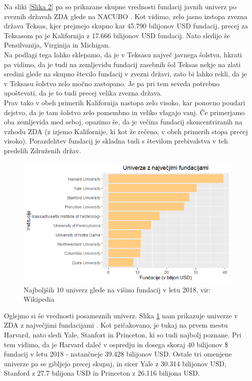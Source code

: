 \documentclass[12pt, a4paper]{article}
\begin{document}
Na sliki \ref{Slika 2} pa so prikazane skupne vrednosti fundacij javnih univerz po zveznih državah ZDA glede na NACUBO \cite{wiki}. Kot vidimo, zelo jasno izstopa zvezna država Teksas, kjer prejmejo skupno kar 45.790 bilijonov USD fundacij, precej za Teksasom pa je Kalifornija z 17.666 bilijonov USD fundacij. Nato sledijo še Pensilvanija, Virginija in Michigan. \\

Na podlagi tega lahko sklepamo, da je v Teksasu največ javnega šolstva, hkrati pa vidimo, da je tudi na zemljevidu fundacij zasebnih šol Teksas nekje na zlati sredini glede na skupno število fundacij v zvezni državi, zato bi lahko rekli, da je v Teksasu šolstvo zelo močno zastopano. Je pa pri tem seveda potrebno upoštevati, da je to tudi precej velika zvezna država. \\

Prav tako v obeh primerih Kalifornija nastopa zelo visoko, kar ponovno poudari dejstvo, da je tam šolstvo zelo pomembno in veliko vlagajo vanj. Če primerjamo oba zemljevida med seboj, opazimo še, da je večina fundacij skoncentriranih na vzhodu ZDA (z izjemo Kalifornije, ki kot že rečeno, v obeh primerih stopa precej visoko). Porazdelitev fundacij je skladna tudi s številom prebivalstva v teh predelih Združenih držav.\\

\begin{figure}[!h]
\centering
\includegraphics[width = 15 cm]{grafi_zemljevidi/top10.png}
\caption{Najboljših 10 univerz glede na višino fundacij v letu 2018, vir: Wikipedia}
\label{Slika 3}
\end{figure}

Oglejmo si še vrednosti posameznih univerz. Slika \ref{Slika 3} nam prikazuje univerze v ZDA z največjimi fundacijami \cite{wiki}. Kot pričakovano, je tukaj na prvem mestu Harvard, nato sledi Yale, Stanfort in Princeton, ki so tudi najbolj poznane. Pri tem vidimo, da je Harvard daleč v ospredju in dosega skoraj 40 bilijonov \$ fundacij v letu 2018 - natančneje 39.428 bilijonov USD. Ostale tri omenjene univerze pa se gibljejo precej skupaj, in sicer Yale z 30.314
bilijonov USD, Stanford z 27.7 bilijona USD in Princeton z 26.116 bilijona USD.
\end{document}

